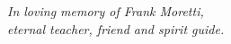 %

\vspace*{\fill}
\begin{center}
      \emph{In loving memory of Frank Moretti,\\
      		\hspace{7ex}eternal teacher, friend and spirit guide.}
\end{center}
\vspace*{\fill}

